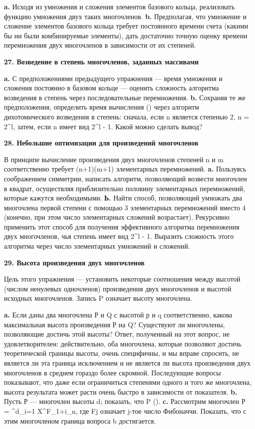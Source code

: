 \textbf{a.} Исходя из умножения и сложения элементов базового кольца, реализовать функцию умножения двух таких многочленов.
\textbf{b.} Предполагая, что умножение и сложение элементов базового кольца требует постоянного времени счета (какими бы ни были комбинируемые элементы), дать достаточно точную оценку времени перемножения двух многочленов в зависимости от их степеней.

\textbf{27. Возведение в степень многочленов, заданных массивами}

\textbf{a.} С предположениями предыдущего упражнения — время умножения и сложения постоянно в базовом кольце — оценить сложность алгоритма возведения в степень через последовательные перемножения.
\textbf{b.} Сохраняя те же предположения, определить время вычисления () через алгоритм дихотомического возведения в степень: сначала, если n является степенью 2, n = 2^{l}, затем, если n имеет вид 2^{l} - 1. Какой можно сделать вывод?

\textbf{28. Небольшие оптимизации для произведений многочленов}

В принципе вычисление произведения двух многочленов степеней n и m соответственно требует (n+1)(m+1) элементарных перемножений.
\textbf{a.} Пользуясь соображением симметрии, написать алгоритм, позволяющий возвести многочлен в квадрат, осуществляя приблизительно половину элементарных перемножений, которые кажутся необходимыми.
\textbf{Ь.} Найти способ, позволяющий умножать два многочлена первой степени с помощью 3 элементарных перемножений вместо 4 (конечно, при этом число элементарных сложений возрастает). Рекурсивно применить этот способ для получения эффективного алгоритма перемножения двух многочленов, чья степень имеет вид 2^{l} - 1. Выразить сложность этого алгоритма через число элементарных умножений и сложений.

\textbf{29. Высота произведения двух многочленов}

Цель этого упражнения — установить некоторые соотношения между высотой (числом ненулевых одночленов) произведения двух многочленов и высотой исходных многочленов. Запись \sharp P означает высоту многочлена.

\textbf{a.} Если даны два многочлена Р и Q с высотой р и q соответственно, какова максимальная высота произведения Р на Q? Существуют ли многочлены, позволяющие достичь этой высоты?
Ответ, полученный на этот вопрос, не удовлетворителен: действительно, оба многочлена, которые позволяют достичь теоретической границы высоты, очень специфичны, и мы вправе спросить, не является ли эта граница исключением и не является ли высота произведения двух многочленов в среднем гораздо более скромной. Последующие вопросы показывают, что даже если ограничиться степенями одного и того же многочлена, высота результата может расти очень быстро в зависимости от показателя.
\textbf{b.} Пусть Р — многочлен высоты d; показать, что \sharp P \leqslant ().
\textbf{c.} Рассмотрим многочлен Р = \sum^{d}_{i=1} X^{F_{1+i_{n}}}, где Fj означает j-тое число Фибоначчи. Показать, что с этим многочленом граница вопроса b достигается.

